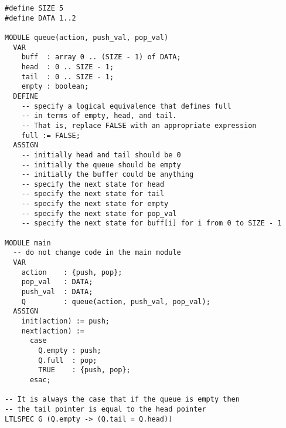 \documentclass[12pt]{article}
\begin{document}
\newpage 
\begin{verbatim}
#define SIZE 5
#define DATA 1..2

MODULE queue(action, push_val, pop_val)
  VAR
    buff  : array 0 .. (SIZE - 1) of DATA;
    head  : 0 .. SIZE - 1;
    tail  : 0 .. SIZE - 1;
    empty : boolean;
  DEFINE
    -- specify a logical equivalence that defines full
    -- in terms of empty, head, and tail.
    -- That is, replace FALSE with an appropriate expression
    full := FALSE;
  ASSIGN
    -- initially head and tail should be 0 
    -- initially the queue should be empty
    -- initially the buffer could be anything
    -- specify the next state for head
    -- specify the next state for tail
    -- specify the next state for empty
    -- specify the next state for pop_val
    -- specify the next state for buff[i] for i from 0 to SIZE - 1

MODULE main
  -- do not change code in the main module 
  VAR
    action    : {push, pop};
    pop_val   : DATA;
    push_val  : DATA;
    Q         : queue(action, push_val, pop_val);
  ASSIGN
    init(action) := push;
    next(action) :=
      case
        Q.empty : push;
        Q.full  : pop;
        TRUE    : {push, pop};
      esac;

-- It is always the case that if the queue is empty then 
-- the tail pointer is equal to the head pointer
LTLSPEC G (Q.empty -> (Q.tail = Q.head))

\end{verbatim}
\end{document}
